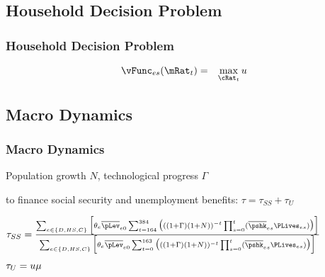 \subsection{Household Decision Problem}

\begin{frame}
\frametitle{Household Decision Problem}
\begin{eqnarray*}
\vFunc_{es}(\mRat_t) &=& \max_{\cRat_t} \util %
\end{eqnarray*}
\end{frame}

\subsection{Macro Dynamics}
\begin{frame}
\frametitle{Macro Dynamics}
\bi
\item Population growth $N$, technological progress $\Gamma$
\item {} to finance social security and unemployment benefits: $\tau=\tau_{SS}+\tau_U$
\item
$
\tau_{SS} = \frac{\sum_{e \in \{D,HS,C\}} \Big[ \theta_e \overline{\pLev}_{e0} \sum_{t = 164}^{384} \big( ((1 + \Gamma)(1+N))^{-t} \prod_{s=0}^t ( \overline{\pshk}_{es} \PLives_{es} ) \big) \Big]}
{\sum_{e \in \{D,HS,C\}} \Big[ \theta_e \overline{\pLev}_{e0} \sum_{t = 0}^{163} \big( ((1 + \Gamma)(1+N) )^{-t} \prod_{s=0}^t ( \overline{\pshk}_{es} \PLives_{es} ) \big) \Big]}
$
\item $\tau_U=u\mu$
\ei
\end{frame}

